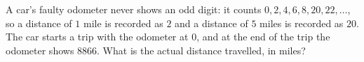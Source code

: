 A car's faulty odometer never shows an odd digit: it counts $0,2,4,6,8,20,22,\dots$, so a distance of $1$ mile is recorded as $2$ and a distance of $5$ miles is recorded as $20$. The car starts a trip with the odometer at $0$, and at the end of the trip the odometer shows $8866$. What is the actual distance travelled, in miles?
